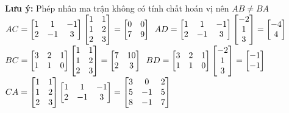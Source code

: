 \documentclass[12pt]{report}
\begin{document}
\textbf{Lưu ý:} Phép nhân ma trận không có tính chất hoán vị nên $AB \neq BA$\\
$AC = \begin{bmatrix} 1 & 1 & - 1 \\ 2 & -1 & 3 \end{bmatrix} \begin{bmatrix} 1 & 1 \\ 1 & 2 \\ 2 & 3 \end{bmatrix} = \begin{bmatrix} 0 & 0 \\ 7 & 9\end{bmatrix}\\$
$AD = \begin{bmatrix} 1 & 1 & - 1 \\ 2 & -1 & 3 \end{bmatrix} \begin{bmatrix} -2 \\ 1 \\ 3 \end{bmatrix} = \begin{bmatrix} -4 \\ 4\end{bmatrix}\\$
$BC = \begin{bmatrix} 3 & 2 & 1 \\ 1 & 1 & 0 \end{bmatrix} \begin{bmatrix} 1 & 1 \\ 1 & 2 \\ 2 & 3 \end{bmatrix} = \begin{bmatrix} 7 & 10 \\ 2 & 3 \end{bmatrix}\\$
$BD = \begin{bmatrix} 3 & 2 & 1 \\ 1 & 1 & 0 \end{bmatrix} \begin{bmatrix} -2 \\ 1 \\ 3 \end{bmatrix} = \begin{bmatrix} -1 \\ -1 \end{bmatrix}\\$
$CA = \begin{bmatrix} 1 & 1 \\ 1 & 2 \\ 2 & 3 \end{bmatrix} \begin{bmatrix} 1 & 1 & - 1 \\ 2 & -1 & 3 \end{bmatrix} = \begin{bmatrix} 3 & 0 & 2 \\ 5 & -1 & 5 \\ 8 & -1 & 7 \end{bmatrix}\\$
\end{document}

